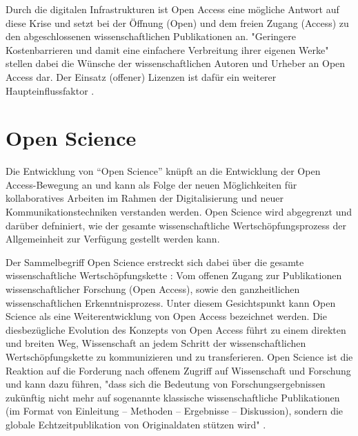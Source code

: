 Durch die digitalen Infrastrukturen ist Open Access eine mögliche Antwort auf diese Krise und setzt bei der Öffnung (Open) und dem freien Zugang (Access) zu den abgeschlossenen wissenschaftlichen Publikationen an. "Geringere Kostenbarrieren und damit eine einfachere Verbreitung ihrer eigenen Werke" \cite{WD_bundestag_2009} stellen dabei die Wünsche der wissenschaftlichen Autoren und Urheber an Open Access dar. Der Einsatz (offener) Lizenzen ist dafür ein weiterer Haupteinflussfaktor \cite{cite:16}.

\section{Open Science}
Die Entwicklung von “Open Science” knüpft an die Entwicklung der Open Access-Bewegung an und kann als Folge der neuen Möglichkeiten für kollaboratives Arbeiten im Rahmen der Digitalisierung und neuer Kommunikationstechniken verstanden werden. Open Science wird abgegrenzt und darüber defniniert, wie der gesamte wissenschaftliche Wertschöpfungsprozess der Allgemeinheit zur Verfügung gestellt werden kann.

Der Sammelbegriff Open Science erstreckt sich dabei über die gesamte wissenschaftliche Wertschöpfungskette \cite{Scheliga_2014}: Vom offenen Zugang zur Publikationen wissenschaftlicher Forschung (Open Access), sowie den ganzheitlichen wissenschaftlichen Erkenntnisprozess. Unter diesem Gesichtspunkt kann Open Science als eine Weiterentwicklung von Open Access bezeichnet werden. Die diesbezügliche Evolution des Konzepts von Open Access führt zu einem direkten und breiten Weg, Wissenschaft an jedem Schritt der wissenschaftlichen Wertschöpfungskette zu kommunizieren und zu transferieren. Open Science ist die Reaktion auf die Forderung nach offenem Zugriff auf Wissenschaft und Forschung und kann dazu führen, "dass sich die Bedeutung von Forschungsergebnissen zukünftig nicht mehr auf sogenannte klassische wissenschaftliche Publikationen (im Format von Einleitung – Methoden – Ergebnisse – Diskussion), sondern die globale Echtzeitpublikation von Originaldaten stützen wird" \cite{Stengel_2013}.

